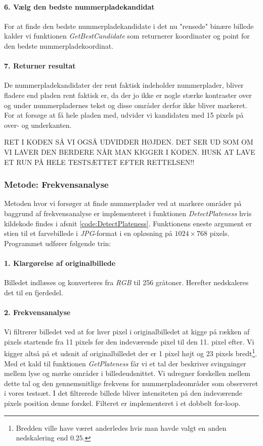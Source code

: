 \paragraph{6. Vælg den bedste nummerpladekandidat}
For at finde den bedste nummerpladekandidate i det nu "rensede" binære billede kalder vi funktionen \textit{GetBestCandidate} som returnerer koordinater og point for den bedste nummerpladekoordinat.

\paragraph{7. Returner resultat}
De nummerpladekandidater der rent faktisk indeholder nummerplader, bliver fladere end pladen rent faktisk er, da der jo ikke er nogle stærke kontraster over og under nummerpladernes tekst og disse områder derfor ikke bliver markeret. For at forsøge at få hele pladen med, udvider vi kandidaten med 15 pixels på over- og underkanten. 

RET I KODEN SÅ VI OGSÅ UDVIDDER HØJDEN. DET SER UD SOM OM VI LAVER DEN BERDERE NÅR MAN KIGGER I KODEN. HUSK AT LAVE ET RUN PÅ HELE TESTSÆTTET EFTER RETTELSEN!!

\subsubsection{Metode: Frekvensanalyse}
Metoden hvor vi forsøger at finde nummerplader ved at markere områder på baggrund af frekvensanalyse er implementeret i funktionen \textit{DetectPlateness} hvis kildekode findes i afsnit \vref{code:DetectPlateness}. Funktionens eneste argument er stien til et farvebillede i \textit{JPG}-format i en opløsning på $1024 \times 768$ pixels. Programmet udfører følgende trin:

\paragraph{1. Klargørelse af originalbillede}
Billedet indlæses og konverteres fra \textit{RGB} til 256 gråtoner. Herefter nedskaleres det til en fjerdedel.

\paragraph{2. Frekvensanalyse}
Vi filtrerer billedet ved at for hver pixel i originalbilledet at kigge på rækken af pixels startende fra 11 pixels før den indeværende pixel til den 11. pixel efter. Vi kigger altså på et udsnit af originalbilledet der er 1 pixel højt og 23 pixels bredt\footnote{Bredden ville have været anderledes hvis man havde valgt en anden nedskalering end $0.25$.}. Med et kald til funktionen \textit{GetPlateness} får vi et tal der beskriver svingninger mellem lyse og mørke områder i billedeudsnittet. Vi udregner forskellen mellem dette tal og den gennemsnitlige frekvens for nummerpladeområder som observeret i vores testsæt. I det filtrerede billede bliver intensiteten på den indeværende pixels position denne forskel. Filteret er implementeret i et dobbelt for-loop.

